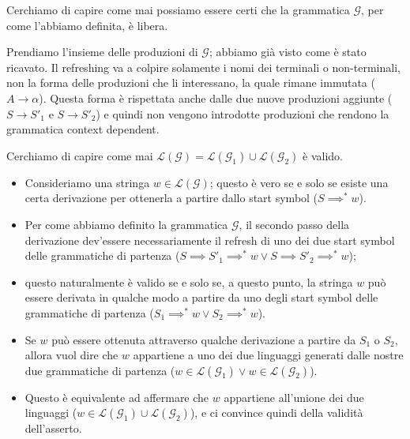 \documentclass[class=book, crop=false, oneside, 12pt]{standalone}
\begin{document}
\begin{osservazione}
  Cerchiamo di capire come mai possiamo essere certi che la grammatica \(\mathcal{G}\), per come l'abbiamo definita, è libera.

  Prendiamo l'insieme delle produzioni di \(\mathcal{G}\); abbiamo già visto come è stato ricavato. Il refreshing va a colpire solamente i nomi dei terminali o non-terminali, non la forma delle produzioni che li interessano, la quale rimane immutata (\(A \rightarrow \alpha\)). Questa forma è rispettata anche dalle due nuove produzioni aggiunte (\(S \rightarrow S'_1\) e \(S \rightarrow S'_2\)) e quindi non vengono introdotte produzioni che rendono la grammatica context dependent.

\end{osservazione}

\begin{osservazione}
  Cerchiamo di capire come mai  \(\mathcal{L(G)} = \mathcal{L}(\mathcal{G}_1)  \cup \mathcal{L}(\mathcal{G}_2) \) è valido.
  \begin{itemize}
    \item Consideriamo una stringa \(w \in \mathcal{L(G)}\); questo è vero se e solo se esiste una certa derivazione per ottenerla a partire dallo start symbol (\(S \implies^* w\)).
    \item Per come abbiamo definito la grammatica \(\mathcal{G}\), il secondo passo della derivazione dev'essere necessariamente il refresh di uno dei due start symbol delle grammatiche di partenza (\(S \implies S'_1 \implies^* w \lor S \implies S'_2 \implies^* w\));
    \item questo naturalmente è valido se e solo se, a questo punto, la stringa \(w\) può essere derivata in qualche modo a partire da uno degli start symbol delle grammatiche di partenza (\(S_1 \implies^* w \lor S_2 \implies^* w\)).
    \item Se \(w\) può essere ottenuta attraverso qualche derivazione a partire da \(S_1\) o \(S_2\), allora vuol dire che \(w\) appartiene a uno dei due linguaggi generati dalle nostre due grammatiche di partenza (\(w \in \mathcal{L}(\mathcal{G}_1)  \lor w \in \mathcal{L}(\mathcal{G}_2) \)).
    \item Questo è equivalente ad affermare che \(w\) appartiene all'unione dei due linguaggi (\(w \in \mathcal{L}(\mathcal{G}_1)  \cup \mathcal{L}(\mathcal{G}_2) \)), e ci convince quindi della validità dell'asserto.
  \end{itemize}
\end{osservazione}
\end{document}
